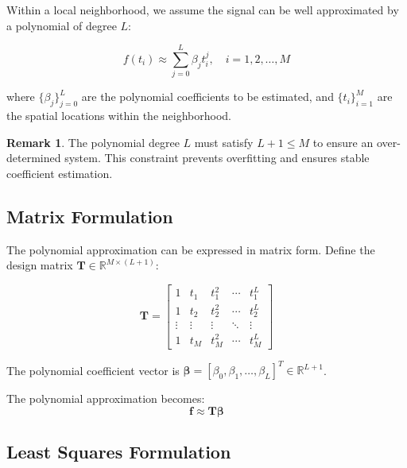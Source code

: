 \documentclass[12pt]{article}
\renewcommand{\vec}[1]{\mathbf{#1}}
\newcommand{\mat}[1]{\mathbf{#1}}
\newcommand{\R}{\mathbb{R}}
\theoremstyle{definition}
\newtheorem{remark}[theorem]{Remark}
\begin{document}
Within a local neighborhood, we assume the signal can be well approximated by a polynomial of degree $L$:

\begin{equation}
    \label{eq:poly_approximation}
    f(t_i) \approx \sum_{j=0}^{L} \beta_j t_i^j, \quad i = 1, 2, \ldots, M
\end{equation}

where $\{\beta_j\}_{j=0}^{L}$ are the polynomial coefficients to be estimated, and $\{t_i\}_{i=1}^{M}$ are the spatial locations within the neighborhood.

\begin{remark}
    The polynomial degree $L$ must satisfy $L + 1 \leq M$ to ensure an over-determined system. This constraint prevents overfitting and ensures stable coefficient estimation.
\end{remark}

\subsection{Matrix Formulation}
\label{subsec:matrix_form}

The polynomial approximation can be expressed in matrix form. Define the design matrix $\mat{T} \in \R^{M \times (L+1)}$:

\begin{equation}
    \label{eq:design_matrix}
    \mat{T} = \begin{bmatrix}
        1      & t_1    & t_1^2  & \cdots & t_1^L  \\
        1      & t_2    & t_2^2  & \cdots & t_2^L  \\
        \vdots & \vdots & \vdots & \ddots & \vdots \\
        1      & t_M    & t_M^2  & \cdots & t_M^L
    \end{bmatrix}
\end{equation}

The polynomial coefficient vector is $\vec{\beta} = [\beta_0, \beta_1, \ldots, \beta_L]^T \in \R^{L+1}$.

The polynomial approximation becomes:
\begin{equation}
    \label{eq:matrix_poly}
    \vec{f} \approx \mat{T}\vec{\beta}
\end{equation}

\subsection{Least Squares Formulation}
\label{subsec:least_squares}
\end{document}
